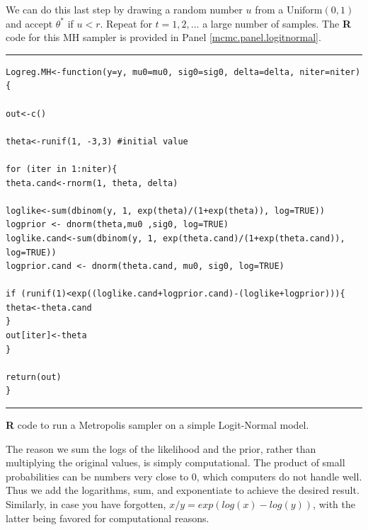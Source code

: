 We can do this last step by drawing a random number $u$ from a
$\mbox{Uniform}(0,1)$ and accept $\theta^{*}$ if
$u<r$.
Repeat for $t = 1,2,\ldots$ a large number of samples.
The {\bf R} code for this MH sampler is provided in Panel \ref{mcmc.panel.logitnormal}.

\begin{panel}[ht]
\centering
\rule[0.15in]{\textwidth}{.03in}
{\small
\begin{verbatim}
Logreg.MH<-function(y=y, mu0=mu0, sig0=sig0, delta=delta, niter=niter) {

out<-c()

theta<-runif(1, -3,3) #initial value

for (iter in 1:niter){
theta.cand<-rnorm(1, theta, delta)

loglike<-sum(dbinom(y, 1, exp(theta)/(1+exp(theta)), log=TRUE))
logprior <- dnorm(theta,mu0 ,sig0, log=TRUE)
loglike.cand<-sum(dbinom(y, 1, exp(theta.cand)/(1+exp(theta.cand)),
log=TRUE))
logprior.cand <- dnorm(theta.cand, mu0, sig0, log=TRUE)

if (runif(1)<exp((loglike.cand+logprior.cand)-(loglike+logprior))){
theta<-theta.cand
}
out[iter]<-theta
}

return(out)
}
\end{verbatim}
}
\rule[-0.15in]{\textwidth}{.03in}
\caption{
{\bf R} code to run a Metropolis sampler on a simple Logit-Normal model.
}
\label{mcmc.panel.logitnormal}
\end{panel}



The reason we sum the logs of the likelihood and the prior, rather
than multiplying the original values, is simply computational. The
product of small probabilities can be numbers very close to 0, which
computers do not handle well. Thus we add the logarithms, sum, and
exponentiate to achieve the desired result. Similarly, in case you
have forgotten, $x/y = exp(log(x)-log(y))$, with
the latter being favored for computational reasons.


